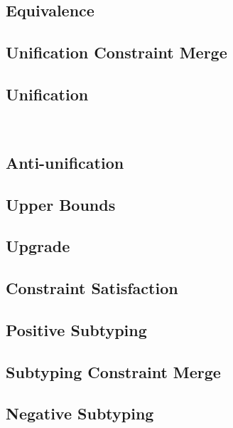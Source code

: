 \documentclass[acmsmall,natbib=false,review,anonymous]{acmart}
\newcommand{\genDir}{_gen}
\begin{document}
\subsection{Equivalence}


\subsection{Unification Constraint Merge}


\subsection{Unification}
\

\subsection{Anti-unification}


\subsection{Upper Bounds}
\label{sec:alg-upper-bounds-proofs}


\subsection{Upgrade}
\label{sec:upgrade-lemmas}


\subsection{Constraint Satisfaction}


\subsection{Positive Subtyping}


\subsection{Subtyping Constraint Merge}


\subsection{Negative Subtyping}

\end{document}
